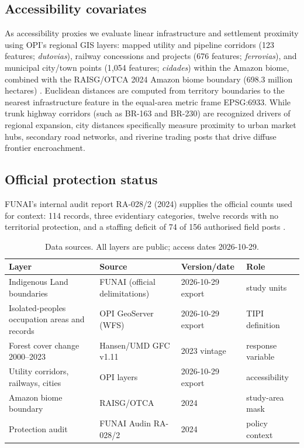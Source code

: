 \subsection{Accessibility covariates}
As accessibility proxies we evaluate linear infrastructure and settlement proximity using OPI's regional GIS layers: mapped utility and pipeline corridors (123 features; \emph{dutovias}), railway concessions and projects (676 features; \emph{ferrovias}), and municipal city/town points (1{,}054 features; \emph{cidades}) within the Amazon biome, combined with the RAISG/OTCA 2024 Amazon biome boundary (698.3 million hectares) \citep{raisg2024}. Euclidean distances are computed from territory boundaries to the nearest infrastructure feature in the equal-area metric frame EPSG:6933. While trunk highway corridors (such as BR-163 and BR-230) are recognized drivers of regional expansion, city distances specifically measure proximity to urban market hubs, secondary road networks, and riverine trading posts that drive diffuse frontier encroachment.

\subsection{Official protection status}
FUNAI's internal audit report RA-028/2 (2024) supplies the official counts used for context: 114 records, three evidentiary categories, twelve records with no territorial protection, and a staffing deficit of 74 of 156 authorised field posts \citep{funai_audit_2024}.

\begin{table}[htbp]
\centering
\footnotesize
\caption{Data sources. All layers are public; access dates 2026-10-29.}
\label{tab:data}
\begin{tabularx}{\columnwidth}{l >{\raggedright\arraybackslash}X l l}
\toprule
Layer & Source & Version/date & Role \\
\midrule
Indigenous Land boundaries & FUNAI (official delimitations) & 2026-10-29 export & study units \\
Isolated-peoples occupation areas and records & OPI GeoServer (WFS) & 2026-10-29 export & TIPI definition \\
Forest cover change 2000--2023 & Hansen/UMD GFC v1.11 & 2023 vintage & response variable \\
Utility corridors, railways, cities & OPI layers & 2026-10-29 export & accessibility \\
Amazon biome boundary & RAISG/OTCA & 2024 & study-area mask \\
Protection audit & FUNAI Audin RA-028/2 & 2024 & policy context \\
\bottomrule
\end{tabularx}
\end{table}

